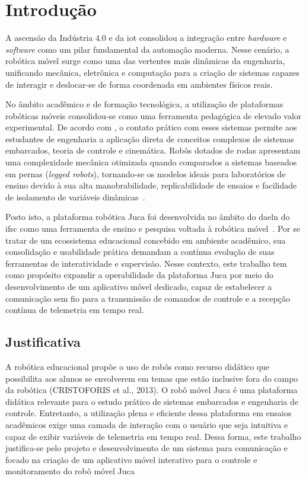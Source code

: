 \chapter{Introdução}
\label{cap:intro}



A ascensão da Indústria 4.0 e da \gls{iot} consolidou a integração entre \emph{hardware} e \emph{software} como um pilar fundamental da automação moderna. Nesse cenário, a robótica móvel surge como uma das vertentes mais dinâmicas da engenharia, unificando mecânica, eletrônica e computação para a criação de sistemas capazes de interagir e deslocar-se de forma coordenada em ambientes físicos reais.

No âmbito acadêmico e de formação tecnológica, a utilização de plataformas robóticas móveis consolidou-se como uma ferramenta pedagógica de elevado valor experimental. De acordo com , o contato prático com esses sistemas permite aos estudantes de engenharia a aplicação direta de conceitos complexos de sistemas embarcados, teoria de controle e cinemática. Robôs dotados de rodas apresentam uma complexidade mecânica otimizada quando comparados a sistemas baseados em pernas (\emph{legged robots}), tornando-se os modelos ideais para laboratórios de ensino devido à sua alta manobrabilidade, replicabilidade de ensaios e facilidade de isolamento de variáveis dinâmicas~\cite{siegwart2011introduction}.

Posto isto, a plataforma robótica Juca foi desenvolvida no âmbito do \gls{daeln} do \gls{ifsc} como uma ferramenta de ensino e pesquisa voltada à robótica móvel~\cite{pinto2025juca}. Por se tratar de um ecossistema educacional concebido em ambiente acadêmico, sua consolidação e usabilidade prática demandam a contínua evolução de suas ferramentas de interatividade e supervisão. Nesse contexto, este trabalho tem como propósito expandir a operabilidade da plataforma Juca por meio do desenvolvimento de um aplicativo móvel dedicado, capaz de estabelecer a comunicação sem fio para a transmissão de comandos de controle e a recepção contínua de telemetria em tempo real.



\section{Justificativa}

A robótica educacional propõe o uso de robôs como recurso didático que possibilita aos alunos se envolverem em temas que estão inclusive fora do campo da robótica (CRISTOFORIS et al., 2013).
O robô móvel Juca é uma plataforma didática relevante para o estudo prático de sistemas embarcados e engenharia de controle. Entretanto, a utilização plena e eficiente dessa plataforma em ensaios acadêmicos exige uma camada de interação com o usuário que seja intuitiva e capaz de exibir variáveis de telemetria em tempo real.
Dessa forma, este trabalho justifica-se pelo projeto e desenvolvimento de um sistema para comunicação e  focado na criação de um aplicativo móvel interativo para o controle e monitoramento do robô móvel Juca

